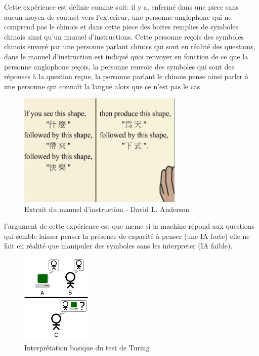 Cette expérience est définie comme suit: \newline
il y a, enfermé dans une piece sans aucun moyen de contact vers l'exterieur, une personne anglophone qui ne comprend 
pas le chinois et dans cette piece des boites remplies de symboles chinois ainsi qu'un manuel d'instructions.
Cette personne reçois des symboles chinois envoyé par une personne parlant chinois qui sont en réalité des questions,
dans le manuel d'instruction est indiqué quoi renvoyer en fonction de ce que la personne anglophone reçois,
la personne renvoie des symboles qui sont des réponses à la question reçue, la personne parlant le chinois
pense ainsi parler à une personne qui connaît la langue alors que ce n'est pas le cas. 
\newpage

\begin{figure}[!h]
    \centering
    \includegraphics[width=0.7\textwidth]{Images/chineserule}
    \caption{Extrait du manuel d'instruction - David L. Anderson}
	\label{fig:chineseroom}
\end{figure}

l'argument de cette expérience est que meme si la machine répond aux questions qui semble laisser penser 
la présence de capacité à penser (une IA forte) elle ne fait en réalité que manipuler des symboles 
sans les interpreter (IA faible). \newline

\begin{figure}[h]
    \centering
    \includegraphics[width=0.3\textwidth]{Images/turingtest}
    \caption{Interprétation basique du test de Turing}
    \label{fig:turingtest}
\end{figure}

